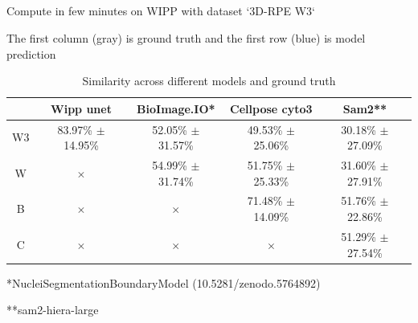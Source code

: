 \subsection{\slidetitle}
\begin{frame}
  \frametitle{\sectiontitle}
  \framesubtitle{\slidetitle}

  Compute in few minutes on WIPP with dataset `3D-RPE W3`

  The first column (gray) is ground truth and the first row (blue) is model prediction

  \begin{center}
    \begin{table}
      \begin{tabular}{|c|c|c|c|c|}
       \hline
       \rowcolor{tableFirstRowColor}      & Wipp unet             & BioImage.IO*          & Cellpose cyto3        & Sam2**   \\ [0.5ex]
       \hline
       \cellcolor{tableFirstColColor} W3  & 83.97\% $\pm$ 14.95\% & 52.05\% $\pm$ 31.57\% & 49.53\% $\pm$ 25.06\% & 30.18\% $\pm$ 27.09\% \\
       \hline
       \cellcolor{tableFirstColColor} W   & $\times$              & 54.99\% $\pm$ 31.74\% & 51.75\% $\pm$ 25.33\% & 31.60\% $\pm$ 27.91\% \\
       \hline
       \cellcolor{tableFirstColColor} B   & $\times$              & $\times$              & 71.48\% $\pm$ 14.09\% & 51.76\% $\pm$ 22.86\% \\
       \hline
       \cellcolor{tableFirstColColor} C   & $\times$              & $\times$              & $\times$              & 51.29\% $\pm$ 27.54\% \\
       \hline
      \end{tabular}
      \caption{Similarity across different models and ground truth}
    \end{table}
  \end{center}

  *NucleiSegmentationBoundaryModel (10.5281/zenodo.5764892)

  **sam2-hiera-large

\end{frame}

\def\slidetitle{Explaining poor results}

